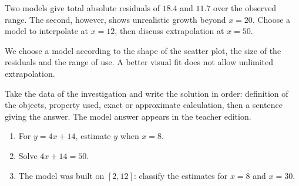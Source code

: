 \begin{activite}
Two models give total absolute residuals of $18.4$ and $11.7$ over the observed range. The second, however, shows unrealistic growth beyond $x=20$. Choose a model to interpolate at $x=12$, then discuss extrapolation at $x=50$.
\begin{center}\end{center}
\end{activite}

\begin{traceecrite}We choose a model according to the shape of the scatter plot, the size of the residuals and the range of use. A better visual fit does not allow unlimited extrapolation.\end{traceecrite}

\begin{exemple}
Take the data of the investigation and write the solution in order: definition of the objects, property used, exact or approximate calculation, then a sentence giving the answer. The model answer appears in the teacher edition.
\end{exemple}

\begin{exercice}[-- essential]
\begin{enumerate}\item For $y=4x+14$, estimate $y$ when $x=8$.\item Solve $4x+14=50$.\item The model was built on $[2,12]$: classify the estimates for $x=8$ and $x=30$.\end{enumerate}
\end{exercice}

